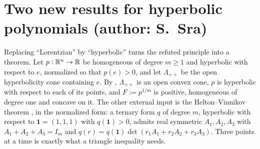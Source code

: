 \section{Two new results for hyperbolic polynomials (author: S.~Sra)}
\label{sec:lorentzianaudit}
\noindent{}

\vskip8pt

Replacing ``Lorentzian'' by ``hyperbolic'' turns the refuted principle into a
theorem.  Let $p:\mathbb R^n\to\mathbb R$ be homogeneous of degree $m\ge1$ and hyperbolic with
respect to $e$, normalized so that $p(e)>0$, and let $\Lambda_{++}$ be the open
hyperbolicity cone containing $e$.  By \citet{Garding1959},
$\Lambda_{++}$ is an open convex cone, $p$ is hyperbolic with respect to each of
its points, and $F:=p^{1/m}$ is positive, homogeneous of degree one and concave
on it.  The other external input is the Helton--Vinnikov theorem
\citep{HeltonVinnikov2007,LewisParriloRamana2005}, in the normalized form: a
ternary form $q$ of degree $m$, hyperbolic with respect to $\mathbf 1=(1,1,1)$
with $q(\mathbf 1)>0$, admits real symmetric $A_1,A_2,A_3$ with
$A_1+A_2+A_3=I_m$ and $q(r)=q(\mathbf 1)\det(r_1A_1+r_2A_2+r_3A_3)$.  Three
points at a time is exactly what a triangle inequality needs.

